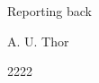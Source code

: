 \pagestyle{empty}%
\vspace*{\fill} %

{\Huge Reporting back}

\bigskip %

{\large A. U. Thor}

\medskip

2222

\vspace*{\fill}

\clearpage %
